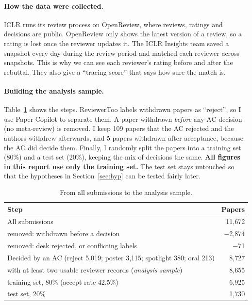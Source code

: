 \documentclass[11pt]{article}
\begin{document}
\paragraph{How the data were collected.} ICLR runs its review process on OpenReview, where reviews, ratings and decisions are public. OpenReview only shows the latest version of a review, so a rating is lost once the reviewer updates it. The ICLR Insights team saved a snapshot every day during the review period and matched each reviewer across snapshots. This is why we can see each reviewer's rating before and after the rebuttal. They also give a ``tracing score'' that says how sure the match is.

\paragraph{Building the analysis sample.} Table~\ref{tab:sample} shows the steps. ReviewerToo labels withdrawn papers as ``reject'', so I use Paper Copilot to separate them. A paper withdrawn \emph{before} any AC decision (no meta-review) is removed. I keep 109 papers that the AC rejected and the authors withdrew afterwards, and 5 papers withdrawn after acceptance, because the AC did decide them. Finally, I randomly split the papers into a training set (80\%) and a test set (20\%), keeping the mix of decisions the same. \textbf{All figures in this report use only the training set.} The test set stays untouched so that the hypotheses in Section~\ref{sec:hyp} can be tested fairly later.

\begin{table}[h]
\centering\small
\begin{tabular}{lr}
\toprule
Step & Papers \\
\midrule
All submissions & 11,672 \\
\quad removed: withdrawn before a decision & $-$2,874 \\
\quad removed: desk rejected, or conflicting labels & $-$71 \\
Decided by an AC (reject 5,019; poster 3,115; spotlight 380; oral 213) & 8,727 \\
\quad with at least two usable reviewer records (\emph{analysis sample}) & 8,655 \\
\quad\quad training set, 80\% (accept rate 42.5\%) & 6,925 \\
\quad\quad test set, 20\% & 1,730 \\
\bottomrule
\end{tabular}
\caption{From all submissions to the analysis sample.}
\label{tab:sample}
\end{table}
\end{document}
